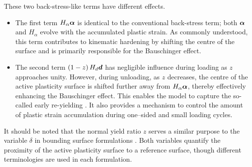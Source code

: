 These two back-stress-like terms have different effects.
\begin{itemize}
    \item The first term $H_\alpha\bm{\alpha}$ is identical to the conventional back-stress term; both $\bm{\alpha}$ and $H_\alpha$ evolve with the accumulated plastic strain.
          As commonly understood, this term contributes to kinematic hardening by shifting the centre of the surface and is primarily responsible for the Bauschinger effect.
    \item The second term $\left(1-z\right)H_d\bm{d}$ has negligible influence during loading as $z$ approaches unity.
    However, during unloading, as $z$ decreases, the centre of the active plasticity surface is shifted further away from $H_\alpha\bm{\alpha}$, thereby effectively enhancing the Bauschinger effect.
    This enables the model to capture the so-called early re-yielding \citep{Yoshida2002a}.
          It also provides a mechanism to control the amount of plastic strain accumulation during one--sided and small loading cycles.
\end{itemize}

It should be noted that the normal yield ratio $z$ serves a similar purpose to the variable $\delta$ in bounding surface formulations \citep{Dafalias1975,Mahan2011}.
Both variables quantify the proximity of the active plasticity surface to a reference surface, though different terminologies are used in each formulation.
